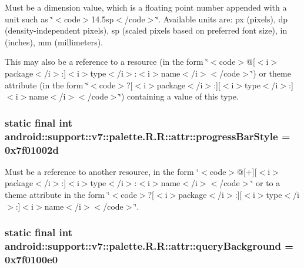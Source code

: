 Must be a dimension value, which is a floating point number appended with a unit such as \char`\"{}$<$code$>$14.5sp$<$/code$>$\char`\"{}. Available units are: px (pixels), dp (density-independent pixels), sp (scaled pixels based on preferred font size), in (inches), mm (millimeters). 

This may also be a reference to a resource (in the form \char`\"{}$<$code$>$@\mbox{[}$<$i$>$package$<$/i$>$:\mbox{]}$<$i$>$type$<$/i$>$:$<$i$>$name$<$/i$>$$<$/code$>$\char`\"{}) or theme attribute (in the form \char`\"{}$<$code$>$?\mbox{[}$<$i$>$package$<$/i$>$:\mbox{]}\mbox{[}$<$i$>$type$<$/i$>$:\mbox{]}$<$i$>$name$<$/i$>$$<$/code$>$\char`\"{}) containing a value of this type. \hypertarget{classandroid_1_1support_1_1v7_1_1palette_1_1_r_1_1attr_218b40c3869681e56fcc354514e682f6}{
\subsubsection[{progressBarStyle}]{\setlength{\rightskip}{0pt plus 5cm}static final int android::support::v7::palette.R.R::attr::progressBarStyle = 0x7f01002d}}
\label{classandroid_1_1support_1_1v7_1_1palette_1_1_r_1_1attr_218b40c3869681e56fcc354514e682f6}


Must be a reference to another resource, in the form \char`\"{}$<$code$>$@\mbox{[}+\mbox{]}\mbox{[}$<$i$>$package$<$/i$>$:\mbox{]}$<$i$>$type$<$/i$>$:$<$i$>$name$<$/i$>$$<$/code$>$\char`\"{} or to a theme attribute in the form \char`\"{}$<$code$>$?\mbox{[}$<$i$>$package$<$/i$>$:\mbox{]}\mbox{[}$<$i$>$type$<$/i$>$:\mbox{]}$<$i$>$name$<$/i$>$$<$/code$>$\char`\"{}. \hypertarget{classandroid_1_1support_1_1v7_1_1palette_1_1_r_1_1attr_d446f866c19ee45b433cf942b6994f98}{
\subsubsection[{queryBackground}]{\setlength{\rightskip}{0pt plus 5cm}static final int android::support::v7::palette.R.R::attr::queryBackground = 0x7f0100e0}}
\label{classandroid_1_1support_1_1v7_1_1palette_1_1_r_1_1attr_d446f866c19ee45b433cf942b6994f98}


